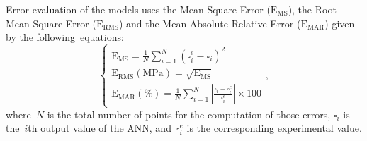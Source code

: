 \documentclass[algorithms,article,accept,pdftex,oneauthor]{Definitions/mdpi}
\DeclareRobustCommand{\MSE}{\text{E}_\text{MS}}
\DeclareRobustCommand{\RMSE}{\text{E}_\text{RMS}}
\DeclareRobustCommand{\MARE}{\text{E}_\text{MAR}}
\DeclareRobustCommand{\MPa}{\text{MPa}}
\begin{document}
Error evaluation of the models uses the Mean Square Error ($\MSE$), the Root Mean Square Error ($\RMSE$) and the Mean Absolute Relative Error ($\MARE$) given by the following~equations:
\begin{equation}
\begin{cases}
\MSE = \frac{1}{N} \sum_{i=1}^{N} \left(\square_i^e - \square_i\right)^2\\
\RMSE (\MPa) = \sqrt{\MSE}\\
\MARE(\%) = \frac{1}{N} \sum_{i=1}^{N}{\left|\frac{\square_i -\square_i^e}{\square_i^e}\right|} \times 100
\end{cases},
\label{eq:Errors}
\end{equation}
where~$N$ is the total number of points for the computation of those errors, $\square_i$ is the~$i$th output value of the ANN, and~$\square_i^e$ is the corresponding experimental value.
\end{document}
